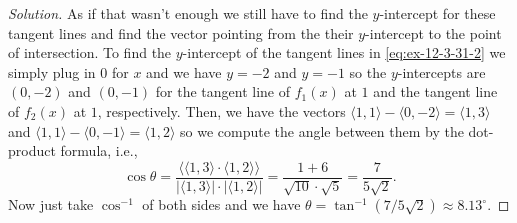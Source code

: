 \begin{proof}[Solution]
As if that wasn't enough we still have to find the $y$-intercept for these
tangent lines and find the vector pointing from the their $y$-intercept to
the point of intersection. To find the $y$-intercept of the tangent lines
in \ref{eq:ex-12-3-31-2} we simply plug in $0$ for $x$ and we have $y=-2$
and $y=-1$ so the $y$-intercepts are $(0,-2)$ and $(0,-1)$ for the tangent
line of $f_1(x)$ at $1$ and the tangent line of $f_2(x)$ at $1$,
respectively. Then, we have the vectors $\langle 1,1\rangle-\langle
0,-2\rangle=\langle1,3\rangle$ and $\langle 1,1\rangle-\langle
0,-1\rangle=\langle 1,2\rangle$ so we compute the angle between them by the
dot-product formula, i.e.,
\[
\cos\theta=\frac{\langle\langle1,3\rangle\cdot\langle 1,2\rangle\rangle}
                {|\langle1,3\rangle|\cdot |\langle
                  1,2\rangle|}=\frac{1+6}{\sqrt{10}\cdot\sqrt{5}}=\frac{7}{5\sqrt{2}}.
\]
Now just take $\cos^{-1}$ of both sides and we have
$\theta=\tan^{-1}(7/5\sqrt{2})\approx 8.13^\circ$.
\end{proof}

